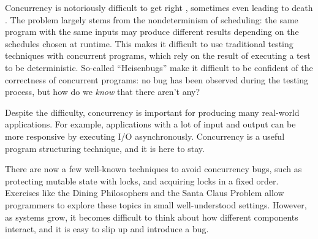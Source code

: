 Concurrency is notoriously difficult to get right \citep{overrated},
sometimes even leading to death \citep{therac25}. The problem largely
stems from the nondeterminism of scheduling: the same program with the
same inputs may produce different results depending on the schedules
chosen at runtime. This makes it difficult to use traditional testing
techniques with concurrent programs, which rely on the result of
executing a test to be deterministic. So-called ``Heisenbugs'' make it
difficult to be confident of the correctness of concurrent programs:
no bug has been observed during the testing process, but how do we
\emph{know} that there aren't any?

Despite the difficulty, concurrency is important for producing many
real-world applications. For example, applications with a lot of input
and output can be more responsive by executing I/O asynchronously.
Concurrency is a useful program structuring technique, and it is here
to stay.

There are now a few well-known techniques to avoid concurrency bugs,
such as protecting mutable state with locks, and acquiring locks in a
fixed order. Exercises like the Dining Philosophers
\citep{diningphilosophers} and the Santa Claus Problem
\citep{santaclaus} allow programmers to explore these topics in small
well-understood settings. However, as systems grow, it becomes
difficult to think about how different components interact, and it is
easy to slip up and introduce a bug.
